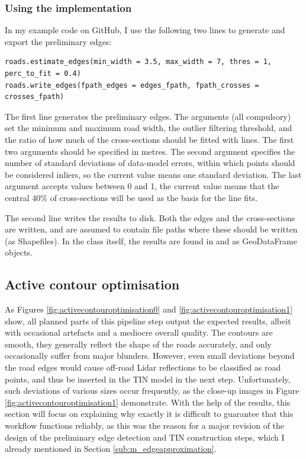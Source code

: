 \subsubsection{Using the implementation}

In my example code on GitHub, I use the following two lines to generate and export the preliminary edges:

\begin{lstlisting}
roads.estimate_edges(min_width = 3.5, max_width = 7, thres = 1, perc_to_fit = 0.4)
roads.write_edges(fpath_edges = edges_fpath, fpath_crosses = crosses_fpath)
\end{lstlisting}

The first line generates the preliminary edges. The arguments (all compulsory) set the minimum and maximum road width, the outlier filtering threshold, and the ratio of how much of the cross-sections should be fitted with lines. The first two arguments should be specified in metres. The second argument specifies the number of standard deviations of data-model errors, within which points should be considered inliers, so the current value means one standard deviation. The last argument accepts values between 0 and 1, the current value means that the central 40\% of cross-sections will be used as the basis for the line fits.

The second line writes the results to disk. Both the edges and the cross-sections are written,  and  are assumed to contain file paths where these should be written (as Shapefiles). In the class itself, the results are found in  and  as GeoDataFrame objects.

\subsection{Active contour optimisation}
\label{sub:r_activecontours}

As Figures \ref{fig:activecontouroptimisation0} and \ref{fig:activecontouroptimisation1} show, all planned parts of this pipeline step output the expected results, albeit with occasional artefacts and a mediocre overall quality. The contours are smooth, they generally reflect the shape of the roads accurately, and only occasionally suffer from major blunders. However, even small deviations beyond the road edges would cause off-road Lidar reflections to be classified as road points, and thus be inserted in the TIN model in the next step. Unfortunately, such deviations of various sizes occur frequently, as the close-up images in Figure \ref{fig:activecontouroptimisation1} demonstrate. With the help of the results, this section will focus on explaining why exactly it is difficult to guarantee that this workflow functions reliably, as this was the reason for a major revision of the design of the preliminary edge detection and TIN construction steps, which I already mentioned in Section \ref{sub:m_edgeapproximation}.

